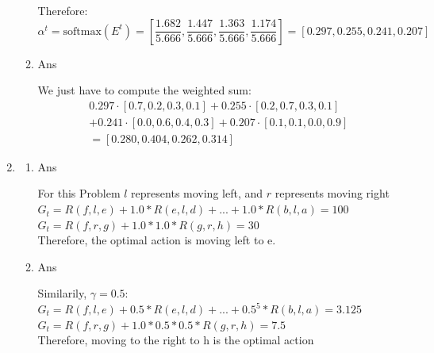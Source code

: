\documentclass[12pt]{article}
\begin{document}
\begin{enumerate}
\begin{enumerate}
\begin{tcolorbox}
    Therefore: \\
    \[
        \alpha^{t} = \text{softmax}(E^{t}) =  [\frac{1.682}{5.666}, \frac{1.447}{5.666}, \frac{1.363}{5.666}, \frac{1.174}{5.666}] = [0.297, 0.255, 0.241, 0.207]
    \]
    
  \end{tcolorbox}
  \newpage
  \item Ans
  \begin{tcolorbox}
    We just have to compute the weighted sum:
    \[
    \begin{gathered}
        0.297 \cdot [0.7, 0.2, 0.3, 0.1] + 0.255 \cdot [0.2, 0.7, 0.3, 0.1] \\
        + 0.241 \cdot [0.0, 0.6, 0.4, 0.3] + 0.207 \cdot [0.1, 0.1, 0.0, 0.9]\\
        = [0.280, 0.404, 0.262, 0.314]
    \end{gathered}
    \]
  \end{tcolorbox}
  \end{enumerate}  
\item
\begin{enumerate}
    \item Ans\\
    \begin{tcolorbox}
        For this Problem \(l\) represents moving left, and \(r\) represents moving right
        \(G_t = R(f,l,e) + 1.0 * R(e, l, d) + ... + 1.0 * R(b, l, a) = 100\)\\
        \(G_t = R(f,r,g) + 1.0 * 1.0 * R(g, r, h) = 30\) \\
        Therefore, the optimal action is moving left to e.
    \end{tcolorbox}
    \item Ans\\
    \begin{tcolorbox}
        Similarily, \(\gamma = 0.5\):\\
        \(G_t = R(f,l,e) + 0.5 * R(e, l, d) + ... + 0.5^{5}* R(b, l, a) = 3.125\)\\
        \(G_t = R(f,r,g) + 1.0 * 0.5 * 0.5 * R(g, r, h) = 7.5\) \\
        Therefore, moving to the right to h is the optimal action
    \end{tcolorbox}
    

\end{enumerate}
\end{enumerate}
\end{document}
